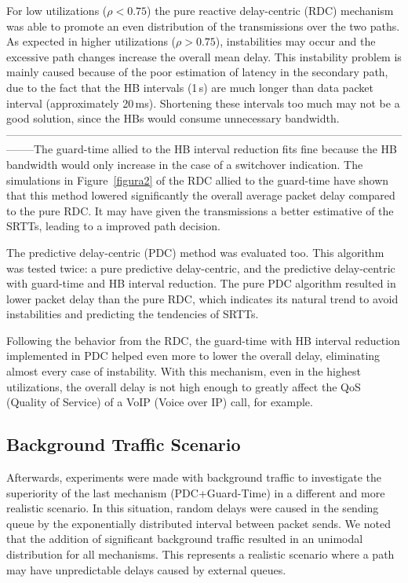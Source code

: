 \documentclass[letterpaper,10pt,oneside,conference,final]{sbrt2015}
\begin{document}
For low utilizations ($\rho < 0.75$) the pure reactive delay-centric (RDC) mechanism was able to promote an even distribution of the transmissions over the two paths. As expected in higher utilizations ($\rho > 0.75$), instabilities may occur and the excessive path changes increase the overall mean delay. This instability problem is mainly caused because of the poor estimation of latency in the secondary path, due to the fact that the HB intervals (1\,s) are much longer than data packet interval (approximately 20\,ms). Shortening these intervals too much may not be a good solution, since the HBs would consume unnecessary bandwidth. --------------------------------------------------------------------------------------------------------------------The guard-time allied to the HB interval reduction fits fine because the HB bandwidth would only increase in the case of a switchover indication. The simulations in Figure~\ref{figura2} of the RDC allied to the guard-time have shown that this method lowered significantly the overall average packet delay compared to the pure RDC. It may have given the transmissions a better estimative of the SRTTs, leading to a improved path decision.

The predictive delay-centric (PDC) method was evaluated too. This algorithm was tested twice: a pure predictive delay-centric, and the predictive delay-centric with guard-time and HB interval reduction. The pure PDC algorithm resulted in lower packet delay than the pure RDC, which indicates its natural trend to avoid instabilities and predicting the tendencies of SRTTs.

Following the behavior from the RDC, the guard-time with HB interval reduction implemented in PDC helped even more to lower the overall delay, eliminating almost every case of instability. With this mechanism, even in the highest utilizations, the overall delay is not high enough to greatly affect the QoS (Quality of Service) of a VoIP (Voice over IP) call, for example.

\subsection{Background Traffic Scenario}
Afterwards, experiments were made with background traffic to investigate the superiority of the last mechanism (PDC+Guard-Time) in a different and more realistic scenario. In this situation, random delays were caused in the sending queue by the exponentially distributed interval between packet sends. We noted that the addition of significant background traffic resulted in an unimodal distribution for all mechanisms. This represents a realistic scenario where a path may have unpredictable delays caused by external queues.
\end{document}
